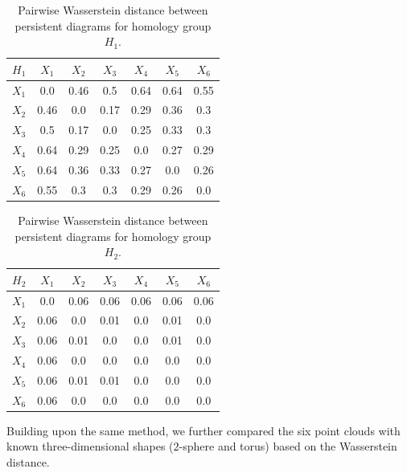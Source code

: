 \begin{table}[!htbp]
        \centering
        \small
        \setlength\tabcolsep{5pt}
        \begin{tabular}{|c|c|c|c|c|c|c|}
\hline
 $H_1$& $X_1$ & $X_2$ & $X_3$ & $X_4$ & $X_5$ & $X_6$ \\ \hline
$X_1$ &
0.0&
0.46&
0.5&
0.64&
0.64&
0.55

\\\hline
$X_2$ &
0.46&
0.0&
0.17&
0.29&
0.36&
0.3
\\\hline
$X_3$ &
0.5&
0.17&
0.0&
0.25&
0.33&
0.3
\\\hline 
$X_4$ &
0.64&
0.29&
0.25&
0.0&
0.27&
0.29
\\\hline 
$X_5$ &
0.64&
0.36&
0.33&
0.27&
0.0&
0.26

\\\hline
$X_6$ &
0.55&
0.3&
0.3&
0.29&
0.26&
0.0\\
\hline
\end{tabular}
\caption{Pairwise Wasserstein distance between persistent diagrams for homology group $H_1$.}
\label{tab:Wass_H1}
\end{table}

\begin{table}[!htbp]
        \centering
        \small
        \setlength\tabcolsep{5pt}
        \begin{tabular}{|c|c|c|c|c|c|c|}
\hline
 $H_2$& $X_1$ & $X_2$ & $X_3$ & $X_4$ & $X_5$ & $X_6$ \\ \hline
$X_1$ &
0.0&
0.06&
0.06&
0.06&
0.06&
0.06
\\
\hline
$X_2$ &
0.06&
0.0&
0.01&
0.0&
0.01&
0.0
\\
\hline
$X_3$ &
0.06&
0.01&
0.0&
0.0&
0.01&
0.0
\\
\hline
$X_4$ &
0.06&
0.0&
0.0&
0.0&
0.0&
0.0
\\
\hline
$X_5$ &
0.06&
0.01&
0.01&
0.0&
0.0&
0.0
\\
\hline
$X_6$ &
0.06&
0.0&
0.0&
0.0&
0.0&
0.0
\\
\hline
\end{tabular}
\caption{Pairwise Wasserstein distance between persistent diagrams for homology group $H_2$.}
\label{tab:Wass_H2}
\end{table}

Building upon the same method, we further compared the six point clouds with known three-dimensional shapes ($2$-sphere and torus) based on the Wasserstein distance.

